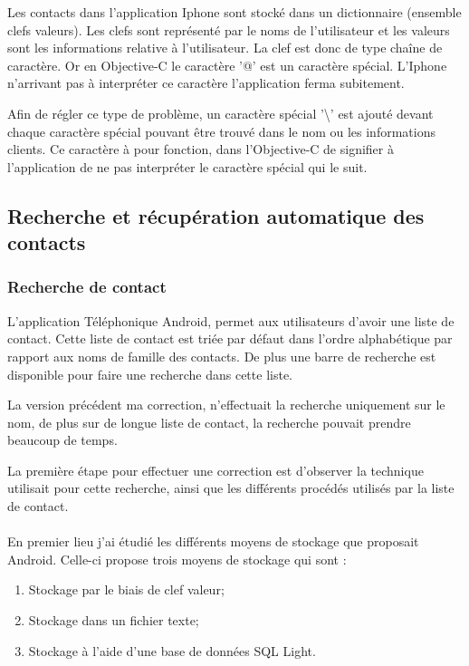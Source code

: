 Les contacts dans l'application Iphone sont stocké dans un dictionnaire (ensemble clefs valeurs). Les clefs sont représenté par le noms de l'utilisateur et les valeurs sont les informations relative à l'utilisateur. La clef est donc de type chaîne de caractère. Or en Objective-C le caractère '@' est un caractère spécial. L'Iphone n'arrivant pas à interpréter ce caractère l'application ferma subitement.

Afin de régler ce type de problème, un caractère spécial '\textbackslash' est ajouté devant chaque caractère spécial pouvant être trouvé dans le nom ou les informations clients. Ce caractère à pour fonction, dans l'Objective-C de signifier à l'application de ne pas interpréter le caractère spécial qui le suit. 

\subsection{Recherche et récupération automatique des contacts}


\subsubsection{Recherche de contact}

L'application Téléphonique Android, permet aux utilisateurs d'avoir une liste de contact. Cette liste de contact est triée par défaut dans l'ordre alphabétique par rapport aux noms de famille des contacts. De plus une barre de recherche est disponible pour faire une recherche dans cette liste.

La version précédent ma correction, n'effectuait la recherche uniquement sur le nom, de plus sur de longue liste de contact, la recherche pouvait prendre beaucoup de temps.

La première étape pour effectuer une correction est d'observer la technique utilisait pour cette recherche, ainsi que les différents procédés utilisés par la liste de contact.\\\\



En premier lieu j'ai étudié les différents moyens de stockage que proposait Android. Celle-ci propose trois moyens de stockage qui sont :

\begin{enumerate}
	\item Stockage par le biais de clef valeur;
	\item Stockage dans un fichier texte;
	\item Stockage à l'aide d'une base de données SQL Light.
\end{enumerate}


